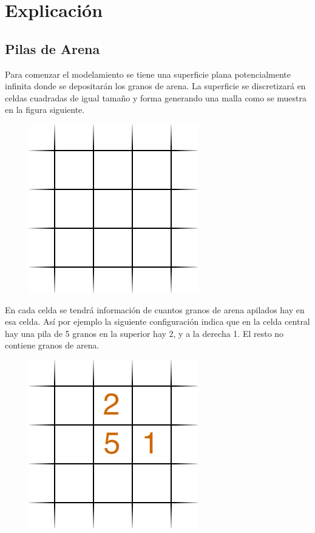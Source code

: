 \documentclass[dcc]{fcfmcourse}
\begin{document}
\section{Explicación}

\subsection{Pilas de Arena}
Para comenzar el modelamiento se tiene una superficie plana potencialmente infinita donde se depositarán los granos de arena. La superficie se discretizará en celdas cuadradas de igual tamaño y forma generando una malla como se muestra en la figura siguiente.

\begin{figure}[!ht]
    \centering
    \includegraphics[scale=0.5]{imagenes/grid.png}
\end{figure}

En cada celda se tendrá información de cuantos granos de arena apilados hay en esa celda. Así por ejemplo la siguiente configuración indica que en la celda central hay una pila de 5 granos en la superior hay 2, y a la derecha 1. El resto no contiene granos de arena.

\begin{figure}[!ht]
    \centering
    \includegraphics[scale=0.5]{imagenes/gridex1.png}
\end{figure}
\end{document}
